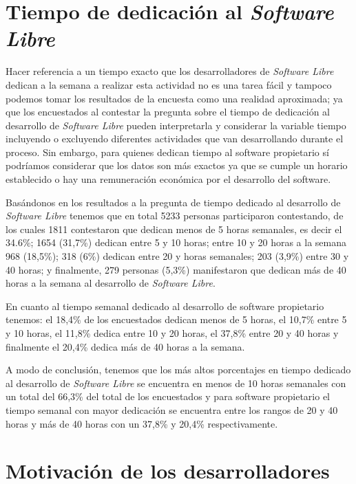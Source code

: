 \section{Tiempo de dedicación al \textit{Software Libre}}

Hacer referencia a un tiempo exacto que los desarrolladores de \textit{Software Libre} dedican a la semana a realizar esta actividad no es una tarea fácil y tampoco podemos tomar los resultados de la encuesta como una realidad aproximada; ya que los encuestados al contestar la pregunta sobre el tiempo de dedicación al desarrollo de \textit{Software Libre} pueden interpretarla y considerar la variable tiempo incluyendo o excluyendo diferentes actividades que van desarrollando durante el proceso. Sin embargo, para quienes dedican tiempo al software propietario sí podríamos considerar que los datos son más exactos ya que se cumple un horario establecido o hay una remuneración económica por el desarrollo del software.

Basándonos en los resultados a la pregunta de tiempo dedicado al desarrollo de \textit{Software Libre} tenemos que en total 5233 personas  participaron contestando, de los cuales 1811 contestaron que dedican menos de 5 horas semanales, es decir el 34.6\%; 1654 (31,7\%) dedican entre 5 y 10 horas; entre 10 y 20 horas a la semana 968 (18,5\%); 318 (6\%) dedican entre 20 y horas semanales; 203 (3,9\%) entre 30 y 40 horas; y finalmente, 279 personas (5,3\%) manifestaron que dedican más de 40 horas a la semana al desarrollo de \textit{Software Libre}.

En cuanto al tiempo semanal dedicado al desarrollo de software propietario tenemos: el 18,4\% de los encuestados dedican menos de 5 horas, el 10,7\% entre 5 y 10 horas, el 11,8\% dedica entre 10 y 20 horas, el 37,8\% entre 20 y 40 horas y finalmente el 20,4\% dedica más de 40 horas a la semana.

A modo de conclusión, tenemos que los más altos porcentajes en tiempo dedicado al desarrollo de \textit{Software Libre} se encuentra en menos de 10 horas  semanales con un total del 66,3\% del total de los encuestados y para software propietario el tiempo semanal con mayor dedicación se encuentra entre los rangos de 20 y 40 horas y más de 40 horas con un 37,8\% y 20,4\% respectivamente.

\section{Motivación de los desarrolladores}

